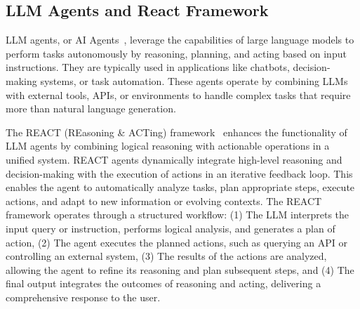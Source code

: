 \subsection{LLM Agents and React Framework}
LLM agents, or AI Agents~\cite{llmagents}, leverage the capabilities of large language models to perform tasks autonomously by reasoning, planning, and acting based on input instructions. 
They are typically used in applications like chatbots, decision-making systems, or task automation. 
These agents operate by combining LLMs with external tools, APIs, or environments to handle complex tasks that require more than natural language generation.

The REACT (REasoning \& ACTing) framework~\cite{yao2023reactsynergizingreasoningacting} enhances the functionality of LLM agents by combining logical reasoning with actionable operations in a unified system. 
REACT agents dynamically integrate high-level reasoning and decision-making with the execution of actions in an iterative feedback loop. 
This enables the agent to automatically analyze tasks, plan appropriate steps, execute actions, and adapt to new information or evolving contexts.
The REACT framework operates through a structured workflow: (1) The LLM interprets the input query or instruction, performs logical analysis, and generates a plan of action, (2) The agent executes the planned actions, such as querying an API or controlling an external system, (3) The results of the actions are analyzed, allowing the agent to refine its reasoning and plan subsequent steps, and (4) The final output integrates the outcomes of reasoning and acting, delivering a comprehensive response to the user.